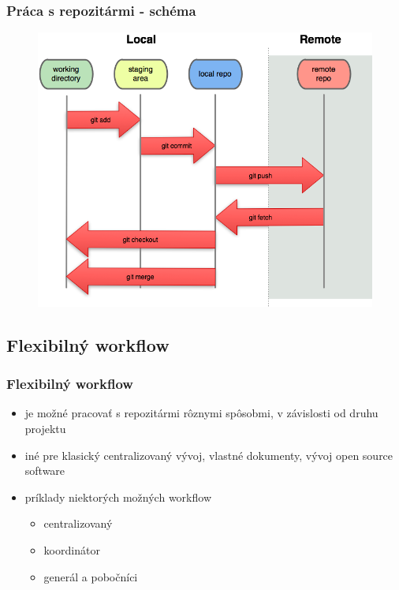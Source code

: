 \documentclass[red]{beamer}
\begin{document}
\begin{frame}
  \frametitle{Práca s repozitármi - schéma}

  \begin{figure}
  \centering
  \includegraphics[scale=0.7]{git-pics/local-remote.png}
\end{figure}
\end{frame}

\subsection{Flexibilný workflow}
\begin{frame}
\frametitle{Flexibilný workflow}
\begin{itemize}
\item je možné pracovať s repozitármi rôznymi spôsobmi, v závislosti od druhu projektu
\item iné pre klasický centralizovaný vývoj, vlastné dokumenty, vývoj open source software
\item príklady niektorých možných workflow
\begin{itemize}
\item centralizovaný 
\item koordinátor
\item generál a pobočníci
 \end{itemize}
 \end{itemize}
\end{frame}
\end{document}
